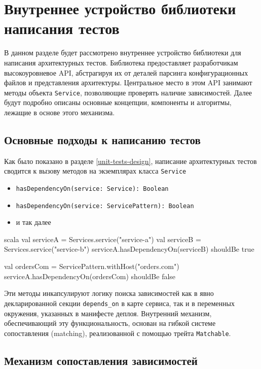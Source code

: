 \section{Внутреннее устройство библиотеки написания тестов}

В данном разделе будет рассмотрено внутреннее устройство библиотеки для написания архитектурных тестов. Библиотека предоставляет разработчикам высокоуровневое API, абстрагируя их от деталей парсинга конфигурационных файлов и представления архитектуры. Центральное место в этом API занимают методы объекта \verb|Service|, позволяющие проверять наличие зависимостей. Далее будут подробно описаны основные концепции, компоненты и алгоритмы, лежащие в основе этого механизма. 

\subsection{Основные подходы к написанию тестов}

Как было показано в разделе \ref{unit-tests-design}, написание архитектурных тестов сводится к вызову методов на экземплярах класса \verb|Service|
\begin{itemize}
    \item \verb|hasDependencyOn(service: Service): Boolean|
    \item \verb|hasDependencyOn(service: ServicePattern): Boolean|
    \item и так далее
\end{itemize}

\begin{code}{scala}
val serviceA = Services.service("service-a")
val serviceB = Services.service("service-b")
serviceA.hasDependencyOn(serviceB) shouldBe true

val ordersCom = ServicePattern.withHost("orders.com")
serviceA.hasDependencyOn(ordersCom) shouldBe false
\end{code}

Эти методы инкапсулируют логику поиска зависимостей как в явно декларированной секции \verb|depends_on| в карте сервиса, так и в переменных окружения, указанных в манифесте деплоя. Внутренний механизм, обеспечивающий эту функциональность, основан на гибкой системе сопоставления (matching), реализованной с помощью трейта \verb|Matchable|.

\subsection{Механизм сопоставления зависимостей}

